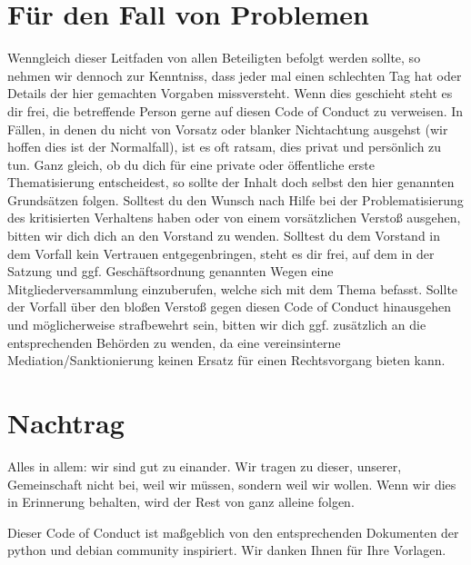 \documentclass[10pt,a4paper]{article}
\newcommand{\qs}[1]{\glqq#1\grqq}
\begin{document}
\section*{F{\"u}r den Fall von Problemen}
Wenngleich dieser \qs{Leitfaden} von allen Beteiligten befolgt werden sollte, so
nehmen wir dennoch zur Kenntniss, dass jeder mal einen \qs{schlechten Tag} hat
oder Details der hier gemachten Vorgaben missversteht. Wenn dies geschieht
steht es dir frei, die betreffende Person gerne auf diesen \qs{Code of Conduct} zu verweisen. In
F{\"a}llen, in denen du nicht von Vorsatz oder blanker Nichtachtung ausgehst (wir
hoffen dies ist der \qs{Normalfall}), ist es oft ratsam, dies privat und pers{\"o}nlich
zu tun. Ganz gleich, ob du dich f{\"u}r eine private oder {\"o}ffentliche erste
Thematisierung entscheidest, so sollte der Inhalt doch selbst den hier
genannten Grunds{\"a}tzen folgen.
Solltest du den Wunsch nach Hilfe bei der Problematisierung des kritisierten
Verhaltens haben oder von einem vors{\"a}tzlichen Versto{\ss} ausgehen, bitten wir dich
dich an den Vorstand zu wenden. Solltest du dem Vorstand in dem Vorfall kein
Vertrauen entgegenbringen, steht es dir frei, auf dem in der Satzung und ggf.
Gesch{\"a}ftsordnung genannten Wegen eine Mitgliederversammlung einzuberufen,
welche sich mit dem Thema befasst.
Sollte der Vorfall {\"u}ber den blo{\ss}en Versto{\ss} gegen diesen \qs{Code of Conduct}
hinausgehen und m{\"o}glicherweise strafbewehrt sein, bitten wir dich ggf.
zus{\"a}tzlich an die entsprechenden Beh{\"o}rden zu wenden, da eine vereinsinterne
Mediation/Sanktionierung keinen Ersatz f{\"u}r einen Rechtsvorgang bieten kann.

\section*{Nachtrag}
Alles in allem: wir sind gut zu einander. Wir tragen zu dieser, unserer,
Gemeinschaft nicht bei, weil wir m{\"u}ssen, sondern weil wir wollen. Wenn wir dies
in Erinnerung behalten, wird der Rest von ganz alleine folgen.

Dieser \qs{Code of Conduct} ist ma{\ss}geblich von den entsprechenden Dokumenten der
python und debian community inspiriert. Wir danken Ihnen f{\"u}r Ihre Vorlagen.
\end{document}
